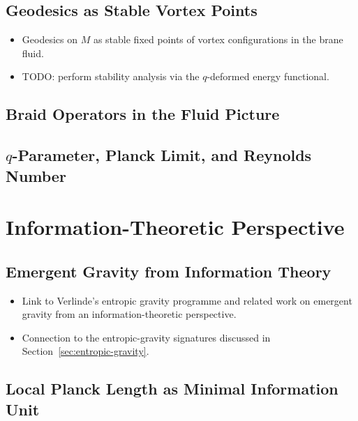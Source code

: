 \documentclass[12pt,a4paper]{report}
\begin{document}
\section{Geodesics as Stable Vortex Points}
\label{sec:geodesic-vortices}

\begin{itemize}
  \item Geodesics on $M$ as stable fixed points of vortex configurations
        in the brane fluid.
  \item TODO: perform stability analysis via the $q$-deformed energy
        functional.
\end{itemize}



\section{Braid Operators in the Fluid Picture}
\label{sec:braid-fluid}





\section{$q$-Parameter, Planck Limit, and Reynolds Number}
\label{sec:planck-reynolds}

 \chapter{Information-Theoretic Perspective}
\label{chap:information-theory}



\section{Emergent Gravity from Information Theory}
\label{sec:emergent-gravity-info}

\begin{itemize}
  \item Link to Verlinde's entropic gravity programme and related work on
        emergent gravity from an information-theoretic perspective.
  \item Connection to the entropic-gravity signatures discussed in
        Section~\ref{sec:entropic-gravity}.
\end{itemize}



\section{Local Planck Length as Minimal Information Unit}
\label{sec:planck-info-unit}
\end{document}
